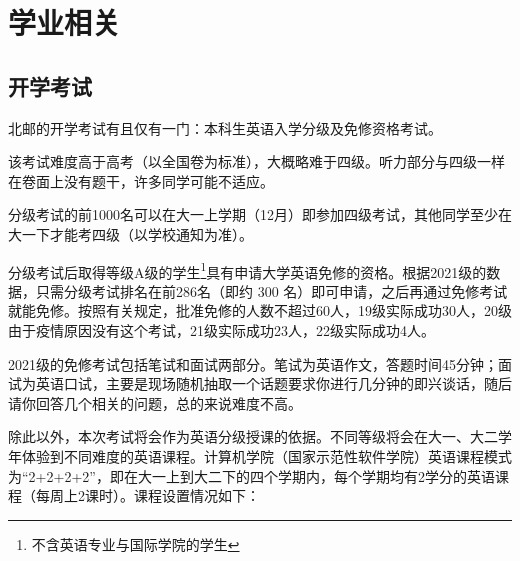 \section{学业相关}

\subsection{开学考试}

北邮的开学考试有且仅有一门：本科生英语入学分级及免修资格考试。

该考试难度高于高考（以全国卷为标准），大概略难于四级。听力部分与四级一样在卷面上没有题干，许多同学可能不适应。

分级考试的前1000名可以在大一上学期（12月）即参加四级考试，其他同学至少在大一下才能考四级（以学校通知为准）。

分级考试后取得等级A级的学生\footnote{不含英语专业与国际学院的学生}具有申请大学英语免修的资格。根据2021级的数据，只需分级考试排名在前286名（即约 300 名）即可申请，之后再通过免修考试就能免修。按照有关规定，批准免修的人数不超过60人，19级实际成功30人，20级由于疫情原因没有这个考试，21级实际成功23人，22级实际成功4人。

2021级的免修考试包括笔试和面试两部分。笔试为英语作文，答题时间45分钟；面试为英语口试，主要是现场随机抽取一个话题要求你进行几分钟的即兴谈话，随后请你回答几个相关的问题，总的来说难度不高。

除此以外，本次考试将会作为英语分级授课的依据。不同等级将会在大一、大二学年体验到不同难度的英语课程。计算机学院（国家示范性软件学院）英语课程模式为“2+2+2+2”，即在大一上到大二下的四个学期内，每个学期均有2学分的英语课程（每周上2课时）。课程设置情况如下：

